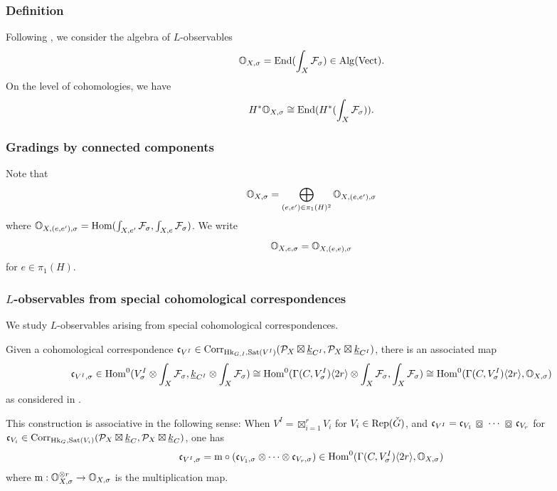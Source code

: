 \documentclass[reqno]{amsart}
\numberwithin{equation}{section}
\numberwithin{equation}{section}
\begin{document}
\subsubsection{Definition}\label{sec:lobsdef}
Following \cite[\S18]{BZSV}, we consider the algebra of $L$-observables \begin{equation}
    \mathbb{O}_{X,\sigma}=\operatorname{End}(\int_X\mathcal{F}_{\sigma})\in \mathrm{Alg}(\mathrm{Vect})
.\end{equation} On the level of cohomologies, we have \begin{equation}
    H^*\mathbb{O}_{X,\sigma}\cong \operatorname{End}(H^*(\int_X\mathcal{F}_{\sigma})).
\end{equation} 

\subsubsection{Gradings by connected components}
Note that \begin{equation}\mathbb{O}_{X,\sigma}=\bigoplus_{(e,e')\in \pi_1(H)^2}\mathbb{O}_{X,(e,e'),\sigma}\end{equation} where $\mathbb{O}_{X,(e,e'),\sigma}=\operatorname{Hom}(\int_{X,e'}\mathcal{F}_{\sigma}, \int_{X,e}\mathcal{F}_{\sigma})$. We write \begin{equation}\mathbb{O}_{X,e,\sigma}=\mathbb{O}_{X,(e,e),\sigma}\end{equation} for $e\in \pi_1(H)$.





\subsubsection{\texorpdfstring{$L$}{L}-observables from special cohomological correspondences}
We study $L$-observables arising from special cohomological correspondences.

Given a cohomological correspondence $\mathfrak{c}_{V^I}\in \mathrm{Corr}_{\operatorname{Hk}_{G,I},\operatorname{Sat}(V^I)}(\mathcal{P}_X\boxtimes\underline{k}_{C^I},\mathcal{P}_X\boxtimes\underline{k}_{C^I})$, there is an associated map \begin{equation}
    \mathfrak{c}_{V^I,\sigma}\in \operatorname{Hom}^0(V_{\sigma}^I\otimes\int_X\mathcal{F}_{\sigma}, \underline{k}_{C^I}\otimes\int_X\mathcal{F}_{\sigma})\cong \operatorname{Hom}^0(\Gamma(C,V_{\sigma}^I)\langle 2r\rangle\otimes\int_X\mathcal{F}_{\sigma}, \int_X\mathcal{F}_{\sigma})\cong \operatorname{Hom}^0(\Gamma(C,V_{\sigma}^I)\langle 2r\rangle, \mathbb{O}_{X,\sigma})
\end{equation} as considered in \cite[\S6.2.1]{liu2025higherperiodintegralsderivatives}.

This construction is associative in the following sense: When $V^I=\boxtimes_{i=1}^r V_i$ for $V_i\in \operatorname{Rep}(\check{G})$, and $\frc_{V^I}=\frc_{V_1}\boxcirc \cdots \boxcirc \frc_{V_r}$ for $\mathfrak{c}_{V_i}\in \mathrm{Corr}_{\operatorname{Hk}_{G},\operatorname{Sat}(V_i)}(\mathcal{P}_X\boxtimes\underline{k}_C,\mathcal{P}_X\boxtimes\underline{k}_C)$, one has \begin{equation}\label{eq:Lobsassoc}
    \mathfrak{c}_{V^I,\sigma}=\mathrm{m}\circ (\mathfrak{c}_{V_1,\sigma}\otimes \cdots \otimes \mathfrak{c}_{V_r,\sigma})\in \operatorname{Hom}^0(\Gamma(C,V_{\sigma}^I)\langle 2r\rangle, \mathbb{O}_{X,\sigma})
\end{equation} where $\mathrm{m}:\mathbb{O}_{X,\sigma}^{\otimes r}\to \mathbb{O}_{X,\sigma}$ is the multiplication map.
\end{document}

